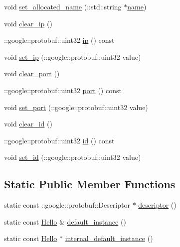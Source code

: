 \begin{DoxyCompactItemize}
\item 
void \hyperlink{class_hello_a059d87ca3bc7da458d6b3e040cf2bb8c}{set\+\_\+allocated\+\_\+name} (\+::std\+::string $\ast$\hyperlink{class_hello_ae6a444f29e20e73dbbf2c4216afe12d7}{name})
\item 
void \hyperlink{class_hello_a102a79ac418e554774c7e24e1be4c7e8}{clear\+\_\+ip} ()
\item 
\+::google\+::protobuf\+::uint32 \hyperlink{class_hello_ae1d6fea6f0359e1006a389e80d5c2cc8}{ip} () const 
\item 
void \hyperlink{class_hello_a97452e4a7b8bfcc4aaf625ec14d28885}{set\+\_\+ip} (\+::google\+::protobuf\+::uint32 value)
\item 
void \hyperlink{class_hello_a0e6b357e2ed2da7a85b3f921630777f7}{clear\+\_\+port} ()
\item 
\+::google\+::protobuf\+::uint32 \hyperlink{class_hello_a3a6580d738360e427005cd9be561695c}{port} () const 
\item 
void \hyperlink{class_hello_ad505980b5747b4afce9ef652f64e8f55}{set\+\_\+port} (\+::google\+::protobuf\+::uint32 value)
\item 
void \hyperlink{class_hello_a53f263abf6095e4c04f842459e68f58c}{clear\+\_\+id} ()
\item 
\+::google\+::protobuf\+::uint32 \hyperlink{class_hello_ac4bce08f939da89c024ff5015351810f}{id} () const 
\item 
void \hyperlink{class_hello_ad27b1fa46dcd021283ca41607829cea8}{set\+\_\+id} (\+::google\+::protobuf\+::uint32 value)
\end{DoxyCompactItemize}
\subsection*{Static Public Member Functions}
\begin{DoxyCompactItemize}
\item 
static const \+::google\+::protobuf\+::\+Descriptor $\ast$ \hyperlink{class_hello_a689385d6a4724382a41a7308beecef1f}{descriptor} ()
\item 
static const \hyperlink{class_hello}{Hello} \& \hyperlink{class_hello_ae740c0449132f0c6d407b278b541b845}{default\+\_\+instance} ()
\item 
static const \hyperlink{class_hello}{Hello} $\ast$ \hyperlink{class_hello_a2e142108ca801c978442fa5a754f1e29}{internal\+\_\+default\+\_\+instance} ()
\end{DoxyCompactItemize}
